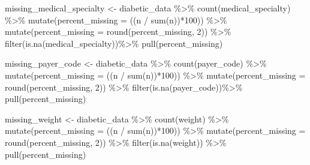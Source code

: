 \documentclass[
]{article}
\newenvironment{Shaded}{\begin{snugshade}}{\end{snugshade}}
\newcommand{\AttributeTok}[1]{\textcolor[rgb]{0.77,0.63,0.00}{#1}}
\newcommand{\DecValTok}[1]{\textcolor[rgb]{0.00,0.00,0.81}{#1}}
\newcommand{\FunctionTok}[1]{\textcolor[rgb]{0.00,0.00,0.00}{#1}}
\newcommand{\NormalTok}[1]{#1}
\newcommand{\OtherTok}[1]{\textcolor[rgb]{0.56,0.35,0.01}{#1}}
\newcommand{\SpecialCharTok}[1]{\textcolor[rgb]{0.00,0.00,0.00}{#1}}
\begin{document}
\begin{Shaded}
\begin{Highlighting}[]
\NormalTok{missing\_medical\_specialty }\OtherTok{\textless{}{-}}\NormalTok{ diabetic\_data }\SpecialCharTok{\%\textgreater{}\%} 
  \FunctionTok{count}\NormalTok{(medical\_specialty) }\SpecialCharTok{\%\textgreater{}\%}
  \FunctionTok{mutate}\NormalTok{(}\AttributeTok{percent\_missing =}\NormalTok{ ((n }\SpecialCharTok{/} \FunctionTok{sum}\NormalTok{(n))}\SpecialCharTok{*}\DecValTok{100}\NormalTok{)) }\SpecialCharTok{\%\textgreater{}\%} 
  \FunctionTok{mutate}\NormalTok{(}\AttributeTok{percent\_missing =} \FunctionTok{round}\NormalTok{(percent\_missing, }\DecValTok{2}\NormalTok{)) }\SpecialCharTok{\%\textgreater{}\%}
  \FunctionTok{filter}\NormalTok{(}\FunctionTok{is.na}\NormalTok{(medical\_specialty))}\SpecialCharTok{\%\textgreater{}\%}
  \FunctionTok{pull}\NormalTok{(percent\_missing)}

\NormalTok{missing\_payer\_code }\OtherTok{\textless{}{-}}\NormalTok{ diabetic\_data }\SpecialCharTok{\%\textgreater{}\%} 
  \FunctionTok{count}\NormalTok{(payer\_code) }\SpecialCharTok{\%\textgreater{}\%}
  \FunctionTok{mutate}\NormalTok{(}\AttributeTok{percent\_missing =}\NormalTok{ ((n }\SpecialCharTok{/} \FunctionTok{sum}\NormalTok{(n))}\SpecialCharTok{*}\DecValTok{100}\NormalTok{)) }\SpecialCharTok{\%\textgreater{}\%} 
  \FunctionTok{mutate}\NormalTok{(}\AttributeTok{percent\_missing =} \FunctionTok{round}\NormalTok{(percent\_missing, }\DecValTok{2}\NormalTok{)) }\SpecialCharTok{\%\textgreater{}\%}
  \FunctionTok{filter}\NormalTok{(}\FunctionTok{is.na}\NormalTok{(payer\_code))}\SpecialCharTok{\%\textgreater{}\%}
  \FunctionTok{pull}\NormalTok{(percent\_missing)}

\NormalTok{missing\_weight }\OtherTok{\textless{}{-}}\NormalTok{ diabetic\_data }\SpecialCharTok{\%\textgreater{}\%} 
  \FunctionTok{count}\NormalTok{(weight) }\SpecialCharTok{\%\textgreater{}\%}
  \FunctionTok{mutate}\NormalTok{(}\AttributeTok{percent\_missing =}\NormalTok{ ((n }\SpecialCharTok{/} \FunctionTok{sum}\NormalTok{(n))}\SpecialCharTok{*}\DecValTok{100}\NormalTok{)) }\SpecialCharTok{\%\textgreater{}\%} 
  \FunctionTok{mutate}\NormalTok{(}\AttributeTok{percent\_missing =} \FunctionTok{round}\NormalTok{(percent\_missing, }\DecValTok{2}\NormalTok{)) }\SpecialCharTok{\%\textgreater{}\%}
  \FunctionTok{filter}\NormalTok{(}\FunctionTok{is.na}\NormalTok{(weight)) }\SpecialCharTok{\%\textgreater{}\%}
  \FunctionTok{pull}\NormalTok{(percent\_missing)}


\end{Highlighting}
\end{Shaded}
\end{document}
